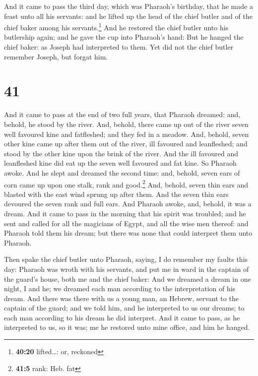  And it came to pass the third day, which was Pharaoh's
birthday, that he made a feast unto all his servants: and he lifted up
the head of the chief butler and of the chief baker among his
servants.\footnote{\textbf{40:20} lifted\ldots: or, reckoned}
 And he restored the chief butler unto his butlership
again; and he gave the cup into Pharaoh's hand:  But he
hanged the chief baker: as Joseph had interpreted to them.
 Yet did not the chief butler remember Joseph, but forgat
him.

\hypertarget{section-40}{%
\section{41}\label{section-40}}

 And it came to pass at the end of two full years, that
Pharaoh dreamed: and, behold, he stood by the river.  And,
behold, there came up out of the river seven well favoured kine and
fatfleshed; and they fed in a meadow.  And, behold, seven
other kine came up after them out of the river, ill favoured and
leanfleshed; and stood by the other kine upon the brink of the river.
 And the ill favoured and leanfleshed kine did eat up the
seven well favoured and fat kine. So Pharaoh awoke.  And
he slept and dreamed the second time: and, behold, seven ears of corn
came up upon one stalk, rank and good.\footnote{\textbf{41:5} rank: Heb.
  fat}  And, behold, seven thin ears and blasted with the
east wind sprung up after them.  And the seven thin ears
devoured the seven rank and full ears. And Pharaoh awoke, and, behold,
it was a dream.  And it came to pass in the morning that
his spirit was troubled; and he sent and called for all the magicians of
Egypt, and all the wise men thereof: and Pharaoh told them his dream;
but there was none that could interpret them unto Pharaoh.

 Then spake the chief butler unto Pharaoh, saying, I do
remember my faults this day:  Pharaoh was wroth with his
servants, and put me in ward in the captain of the guard's house, both
me and the chief baker:  And we dreamed a dream in one
night, I and he; we dreamed each man according to the interpretation of
his dream.  And there was there with us a young man, an
Hebrew, servant to the captain of the guard; and we told him, and he
interpreted to us our dreams; to each man according to his dream he did
interpret.  And it came to pass, as he interpreted to us,
so it was; me he restored unto mine office, and him he hanged.


